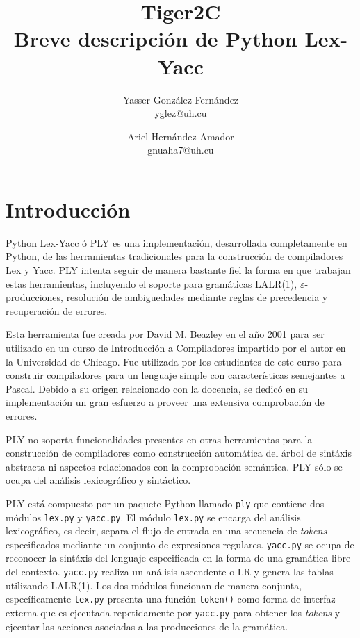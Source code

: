 \documentclass{article}
\title{
	\LARGE{Tiger2C} \\
	\Large{Breve descripción de Python Lex-Yacc}
}
\author{
  	Yasser González Fernández \\
  	\small{yglez@uh.cu}
  	\and
  	Ariel Hernández Amador \\
  	\small{gnuaha7@uh.cu}
}
\date{}
\begin{document}
\maketitle

\thispagestyle{empty}

\newpage

\setcounter{page}{1}

\section{Introducción}

Python Lex-Yacc ó PLY es una implementación, desarrollada completamente en
Python, de las herramientas tradicionales para la construcción de compiladores
Lex y Yacc. PLY intenta seguir de manera bastante fiel la forma en que
trabajan estas herramientas, incluyendo el soporte para gramáticas LALR(1),
$\varepsilon$-producciones, resolución de ambiguedades mediante reglas de
precedencia y recuperación de errores.

Esta herramienta fue creada por David M. Beazley en el año 2001 para ser
utilizado en un curso de Introducción a Compiladores impartido por el autor en
la Universidad de Chicago. Fue utilizada por los estudiantes de este curso
para construir compiladores para un lenguaje simple con características
semejantes a Pascal. Debido a su origen relacionado con la docencia, se dedicó
en su implementación un gran esfuerzo a proveer una extensiva comprobación de
errores.

PLY no soporta funcionalidades presentes en otras herramientas para la
construcción de compiladores como construcción automática del árbol de sintáxis
abstracta ni aspectos relacionados con la comprobación semántica. PLY sólo se
ocupa del análisis lexicográfico y sintáctico.

PLY está compuesto por un paquete Python llamado \texttt{ply} que contiene
dos módulos \texttt{lex.py} y \texttt{yacc.py}. El módulo \texttt{lex.py} se
encarga del análisis lexicográfico, es decir, separa el flujo de entrada en una
secuencia de \textit{tokens} especificados mediante un conjunto de expresiones
regulares. \texttt{yacc.py} se ocupa de reconocer la sintáxis del lenguaje
especificada en la forma de una gramática libre del contexto. \texttt{yacc.py}
realiza un análisis ascendente o LR y genera las tablas utilizando LALR(1). Los
dos módulos funcionan de manera conjunta, específicamente \texttt{lex.py}
presenta una función \texttt{token()} como forma de interfaz externa que es
ejecutada repetidamente por \texttt{yacc.py} para obtener los \textit{tokens} y
ejecutar las acciones asociadas a las producciones de la gramática.
\end{document}
